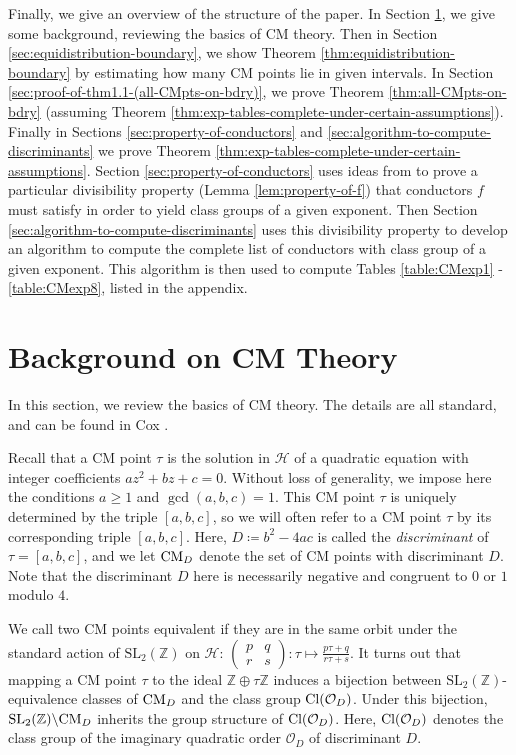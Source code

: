 \documentclass[11pt,letterpaper,reqno]{amsart}
\numberwithin{equation}{section}
\numberwithin{figure}{section}
\numberwithin{table}{section}
\newcommand{\pttmatrix}[4]{
\left(
\begin{smallmatrix}
  #1 & #2 \\
  #3 & #4
\end{smallmatrix}
\right)
}
\newcommand{\ZZ}{\mathbb{Z}}
\newcommand{\SL}{\text{SL}}
\newcommand{\HH}{\mathcal{H}}
\newcommand{\CM}{\textnormal{CM}}
\newcommand{\Cl}[1]{\textnormal{Cl}(\mathcal{O}_{#1})}
\def \t {\tau}
\begin{document}
Finally, we give an overview of the structure of the paper. In Section \ref{sec:CMthry}, we give some background, reviewing the basics of CM theory. Then in Section \ref{sec:equidistribution-boundary}, we show Theorem \ref{thm:equidistribution-boundary}  by estimating how many CM points lie in given intervals. In Section \ref{sec:proof-of-thm1.1-(all-CMpts-on-bdry)}, we prove Theorem \ref{thm:all-CMpts-on-bdry} (assuming Theorem \ref{thm:exp-tables-complete-under-certain-assumptions}). Finally in Sections \ref{sec:property-of-conductors} and \ref{sec:algorithm-to-compute-discriminants} we prove Theorem \ref{thm:exp-tables-complete-under-certain-assumptions}. Section \ref{sec:property-of-conductors} uses ideas from \cite{FanPollack} to prove a particular divisibility property (Lemma \ref{lem:property-of-f}) that conductors $f$ must satisfy in order to yield class groups of a given exponent. Then Section \ref{sec:algorithm-to-compute-discriminants} uses this divisibility property to develop an algorithm to compute the complete list of conductors with class group of a given exponent. This algorithm is then used to compute Tables \ref{table:CMexp1} - \ref{table:CMexp8}, listed in the appendix. 





\section{Background on CM Theory} \label{sec:CMthry}





    
In this section, we review the basics of CM theory. The details are all standard, and can be found in Cox \cite{cox_primes_1989}.


Recall that a CM point $\t$ is the solution in $\HH$ of a quadratic equation with integer coefficients $az^2 + bz + c = 0$. Without loss of generality, we impose here the conditions $a\ge1$ and $\gcd(a,b,c) = 1$.
This CM point $\tau$ is uniquely determined by the triple $[a,b,c]$,
so we will often refer to a CM point $\tau$ by its corresponding triple $[a,b,c]$. Here, $D \coloneq b^2-4ac$ is called the \textit{discriminant} of $\tau = [a,b,c]$, and we let $\CM_D$ denote the set of CM points with discriminant $D$. Note that the discriminant $D$ here is necessarily negative and congruent to $0$ or $1$ modulo $4$.




We call two CM points equivalent if they are in the same orbit under the standard action of $\SL_2(\ZZ)$ on $\HH$: $\pttmatrix{p}{q}{r}{s}: \t \mapsto \frac{p\t+q}{r\t+s}$.
It turns out that mapping a CM point $\tau$ to the ideal $\ZZ \oplus \tau \ZZ$ induces a bijection between $\SL_2(\ZZ)$-equivalence classes of $\CM_D$ and the class group $\Cl{D}$. Under this bijection, $\SL_2(\ZZ) \backslash \CM_D$ inherits the group structure of $\Cl{D}$. 
Here, $\Cl{D}$ denotes the class group of the imaginary quadratic order $\mathcal O_D$ of discriminant $D$. 
\end{document}
